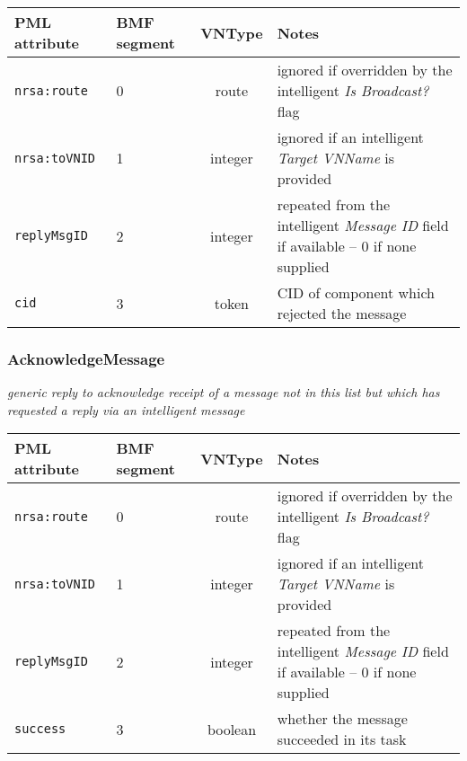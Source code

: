 \documentclass[pdftex,a4paper]{article}
\newcommand{\XMLfont}[1]{{\tt \small #1}}
\begin{document}
\begin{table}[!h]
  \begin{center}
    \label{tab:FailedRoute}
    \begin{tabular}{|l|p{13mm}|c|p{60mm}|}
      \hline

      \textbf{PML attribute} & \textbf{BMF segment} & \textbf{VNType}
      & \textbf{Notes} \\\hline

      \XMLfont{nrsa:route} & 0 & route & ignored if overridden by the
      intelligent {\em Is Broadcast?} flag \\\hline

      \XMLfont{nrsa:toVNID} & 1 & integer & ignored if an intelligent
      {\em Target VNName} is provided \\\hline

      \XMLfont{replyMsgID} & 2 & integer & repeated from the
      intelligent {\em Message ID} field if available -- 0 if none
      supplied \\\hline

      \XMLfont{cid} & 3 & token & CID of component which rejected
      the message \\\hline

    \end{tabular}
  \end{center}
\end{table}

\subsubsection{AcknowledgeMessage}

{\em generic reply to acknowledge receipt of a message not in this list
  but which has requested a reply via an intelligent message}

\begin{table}[!h]
  \begin{center}
    \label{tab:AcknowledgeMessage}
    \begin{tabular}{|l|p{13mm}|c|p{60mm}|}
      \hline

      \textbf{PML attribute} & \textbf{BMF segment} & \textbf{VNType}
      & \textbf{Notes} \\\hline

      \XMLfont{nrsa:route} & 0 & route & ignored if overridden by the
      intelligent {\em Is Broadcast?} flag \\\hline

      \XMLfont{nrsa:toVNID} & 1 & integer & ignored if an intelligent
      {\em Target VNName} is provided \\\hline

      \XMLfont{replyMsgID} & 2 & integer & repeated from the
      intelligent {\em Message ID} field if available -- 0 if none
      supplied \\\hline

      \XMLfont{success} & 3 & boolean & whether the message
      succeeded in its task \\\hline

    \end{tabular}
  \end{center}
\end{table}
\end{document}
